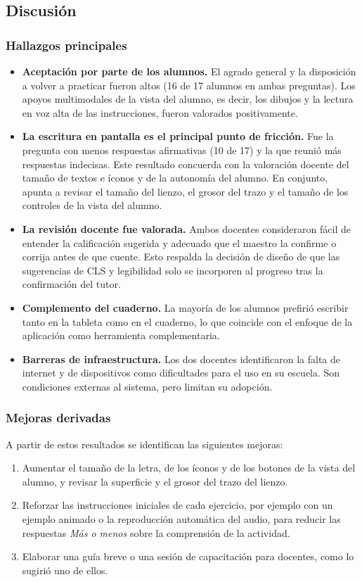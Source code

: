 \subsection{Discusión}
\label{sec:discusion-pruebas}

\subsubsection{Hallazgos principales}
\begin{itemize}
    \item \textbf{Aceptación por parte de los alumnos.} El agrado general y la disposición a volver a practicar fueron altos (16 de 17 alumnos en ambas preguntas). Los apoyos multimodales de la vista del alumno, es decir, los dibujos y la lectura en voz alta de las instrucciones, fueron valorados positivamente.
    \item \textbf{La escritura en pantalla es el principal punto de fricción.} Fue la pregunta con menos respuestas afirmativas (10 de 17) y la que reunió más respuestas indecisas. Este resultado concuerda con la valoración docente del tamaño de textos e íconos y de la autonomía del alumno. En conjunto, apunta a revisar el tamaño del lienzo, el grosor del trazo y el tamaño de los controles de la vista del alumno.
    \item \textbf{La revisión docente fue valorada.} Ambos docentes consideraron fácil de entender la calificación sugerida y adecuado que el maestro la confirme o corrija antes de que cuente. Esto respalda la decisión de diseño de que las sugerencias de CLS y legibilidad solo se incorporen al progreso tras la confirmación del tutor.
    \item \textbf{Complemento del cuaderno.} La mayoría de los alumnos prefirió escribir tanto en la tableta como en el cuaderno, lo que coincide con el enfoque de la aplicación como herramienta complementaria.
    \item \textbf{Barreras de infraestructura.} Los dos docentes identificaron la falta de internet y de dispositivos como dificultades para el uso en su escuela. Son condiciones externas al sistema, pero limitan su adopción.
\end{itemize}

\subsubsection{Mejoras derivadas}
A partir de estos resultados se identifican las siguientes mejoras:
\begin{enumerate}
    \item Aumentar el tamaño de la letra, de los íconos y de los botones de la vista del alumno, y revisar la superficie y el grosor del trazo del lienzo.
    \item Reforzar las instrucciones iniciales de cada ejercicio, por ejemplo con un ejemplo animado o la reproducción automática del audio, para reducir las respuestas \textit{Más o menos} sobre la comprensión de la actividad.
    \item Elaborar una guía breve o una sesión de capacitación para docentes, como lo sugirió uno de ellos.
\end{enumerate}

